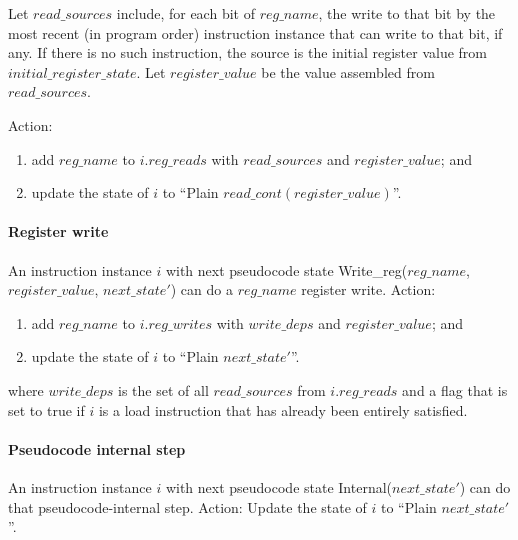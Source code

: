 Let $read\_sources$ include, for each bit of $reg\_name$, the write to that bit by the most recent (in program order) instruction instance that can write to that bit, if any. If there is no such instruction, the source is the initial register value from $initial\_register\_state$.
Let  $register\_value$ be the value assembled from $read\_sources$.

Action:
\begin{enumerate}
\item add $reg\_name$ to $i.reg\_reads$ with $read\_sources$ and $register\_value$; and
\item update the state of $i$ to ``{\sc Plain} $read\_cont(register\_value)$''.
\end{enumerate}


\paragraph{Register write}\label{omm:hart:reg_write}
An instruction instance $i$ with next pseudocode state {\sc Write\_reg}($reg\_name$, $register\_value$, $next\_state'$) can do a $reg\_name$ register write.
Action:
\begin{enumerate}
\item add $reg\_name$ to $i.reg\_writes$ with $write\_deps$ and $register\_value$; and
\item update the state of $i$ to ``{\sc Plain} $next\_state'$''.
\end{enumerate}
where $write\_deps$ is the set of all $read\_sources$ from $i.reg\_reads$ and a flag that is set to true if $i$ is a load instruction that has already been entirely satisfied.


\paragraph{Pseudocode internal step}\label{omm:hart:sail_interp}
An instruction instance $i$ with next pseudocode state {\sc Internal}($next\_state'$) can do that pseudocode-internal step.
Action: Update the state of $i$ to ``{\sc Plain} $next\_state'$''.


